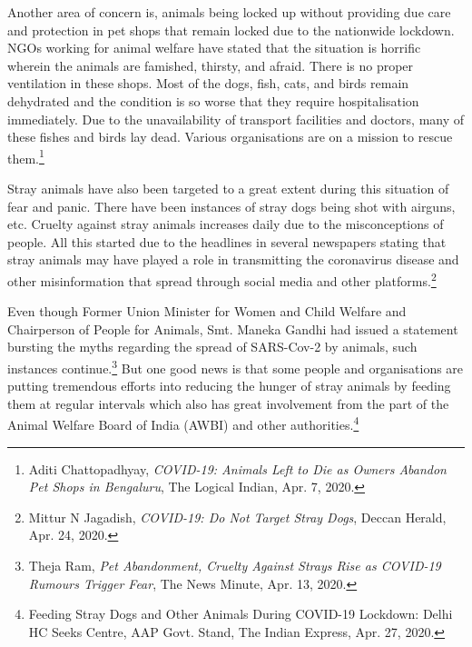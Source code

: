 \begin{multicols}{2}
\noi
Another area of concern is, animals being locked up without providing due care and
protection in pet shops that remain locked due to the nationwide lockdown. NGOs working
for animal welfare have stated that the situation is horrific wherein the animals are famished,
thirsty, and afraid. There is no proper ventilation in these shops. Most of the dogs, fish, cats,
and birds remain dehydrated and the condition is so worse that they require hospitalisation
immediately. Due to the unavailability of transport facilities and doctors, many of these fishes
and birds lay dead. Various organisations are on a mission to rescue them.\footnote{Aditi Chattopadhyay, \textit{COVID-19: Animals Left to Die as Owners Abandon Pet Shops in Bengaluru}, The Logical Indian, Apr. 7, 2020.}

\noi
Stray animals have also been targeted to a great extent during this situation of fear and panic.
There have been instances of stray dogs being shot with airguns, etc. Cruelty against stray
animals increases daily due to the misconceptions of people. All this started due to the
headlines in several newspapers stating that stray animals may have played a role in
transmitting the coronavirus disease and other misinformation that spread through social
media and other platforms.\footnote{Mittur N Jagadish, \textit{COVID-19: Do Not Target Stray Dogs}, Deccan Herald, Apr. 24, 2020.}

\noi
Even though Former Union Minister for Women and Child Welfare and Chairperson of
People for Animals, Smt. Maneka Gandhi had issued a statement bursting the myths
regarding the spread of SARS-Cov-2 by animals, such instances continue.\footnote{Theja Ram, \textit{Pet Abandonment, Cruelty Against Strays Rise as COVID-19 Rumours Trigger Fear}, The News Minute, Apr. 13, 2020. } But one good
news is that some people and organisations are putting tremendous efforts into reducing the hunger of stray animals by feeding them at regular intervals which also has great involvement
from the part of the Animal Welfare Board of India (AWBI) and other authorities.\footnote{Feeding Stray Dogs and Other Animals During COVID-19 Lockdown: Delhi HC Seeks Centre, AAP Govt. Stand, The Indian Express, Apr. 27, 2020.}




\end{multicols}
